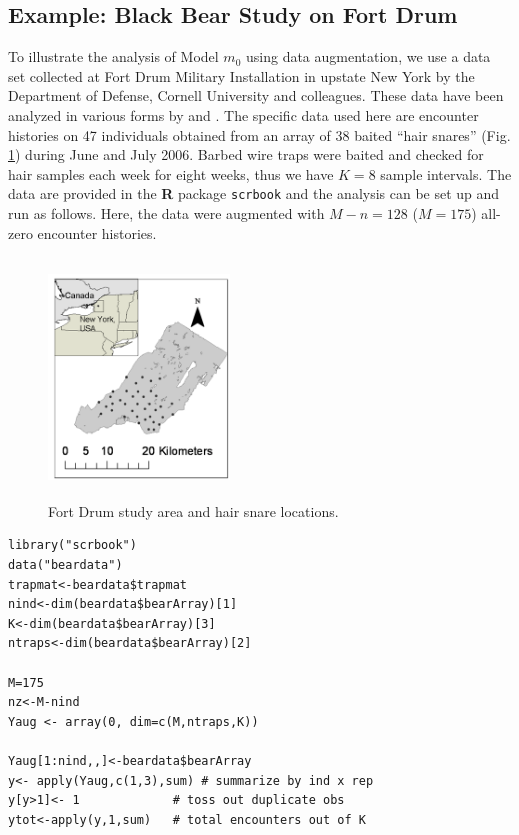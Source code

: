 \subsection{Example: Black Bear Study on Fort Drum}

To illustrate the analysis of Model $m_0$ using data augmentation, we use
a data set collected at Fort Drum Military Installation in upstate New
York by the Department of Defense, Cornell University and
colleagues. These data have been analyzed in various forms by
\citet{wegan:2008,gardner_etal:2009} and \citet{gardner_etal:2010jwm}.
The specific data used here are encounter histories on 47 individuals
obtained from an array of 38 baited ``hair snares''
(Fig. \ref{fig.3.bears1}) during June and July 2006.  Barbed wire
traps were baited and checked for hair samples each week for eight
weeks, thus we have $K=8$ sample intervals. The data are provided 
in the {\bf R} package \mbox{\tt scrbook} 
and the analysis can be set up and run as
follows. Here, the data were augmented with $M-n = 128$ ($M=175$)
all-zero encounter histories.

\begin{figure}
\centering
\includegraphics[height=2.5in,width=1.9in]{Ch3/figs/hairsnares.png}
\caption{Fort Drum study area and hair snare locations.}
\label{fig.3.bears1}
\end{figure}

{\small
\begin{verbatim}
library("scrbook")
data("beardata")
trapmat<-beardata$trapmat
nind<-dim(beardata$bearArray)[1]
K<-dim(beardata$bearArray)[3]
ntraps<-dim(beardata$bearArray)[2]

M=175
nz<-M-nind
Yaug <- array(0, dim=c(M,ntraps,K))

Yaug[1:nind,,]<-beardata$bearArray
y<- apply(Yaug,c(1,3),sum) # summarize by ind x rep
y[y>1]<- 1             # toss out duplicate obs
ytot<-apply(y,1,sum)   # total encounters out of K
\end{verbatim}
}

